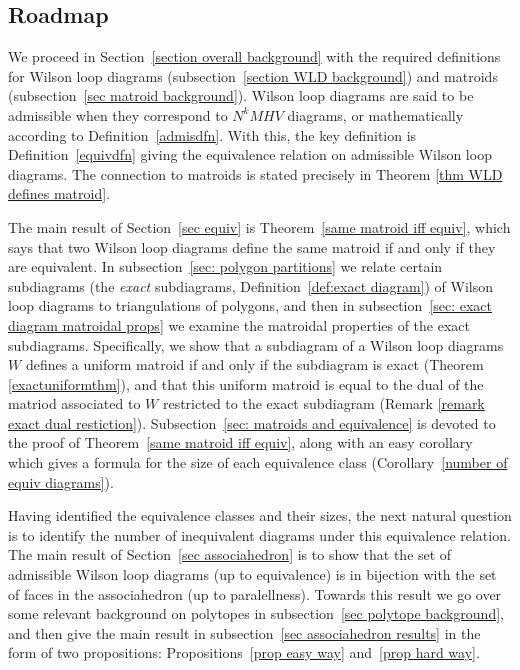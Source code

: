 \documentclass[11pt]{article}
\theoremstyle{remark}
\theoremstyle{definition}
\begin{document}
\subsection{Roadmap}

We proceed in Section~\ref{section overall background} with the required definitions for Wilson loop diagrams (subsection~\ref{section WLD background}) and matroids (subsection~\ref{sec matroid background}).  Wilson loop diagrams  are said to be admissible when they correspond to $N^kMHV$ diagrams, or mathematically according to Definition~\ref{admisdfn}.  With this, the key definition is Definition~\ref{equivdfn} giving the equivalence relation on admissible Wilson loop diagrams.  The connection to matroids is stated precisely in Theorem \ref{thm WLD defines matroid}.

The main result of Section~\ref{sec equiv} is Theorem~\ref{same matroid iff equiv}, which says that two Wilson loop diagrams define the same matroid if and only if they are equivalent.  In subsection~\ref{sec: polygon partitions} we relate certain subdiagrams (the {\em exact} subdiagrams, Definition~\ref{def:exact diagram}) of Wilson loop diagrams to triangulations of polygons, and then in subsection~\ref{sec: exact diagram matroidal props} we examine the matroidal properties of the exact subdiagrams.  Specifically, we show that a subdiagram of a Wilson loop diagrams $W$ defines a uniform matroid if and only if the subdiagram is exact (Theorem \ref{exactuniformthm}), and that this uniform matroid is equal to the dual of the matriod associated to $W$ restricted to the exact subdiagram (Remark \ref{remark exact dual restiction}).  Subsection~\ref{sec: matroids and equivalence} is devoted to the proof of Theorem~\ref{same matroid iff equiv}, along with an easy corollary which gives a formula for the size of each equivalence class (Corollary~\ref{number of equiv diagrams}).

Having identified the equivalence classes and their sizes, the next natural question is to identify the number of inequivalent diagrams under this equivalence relation.  The main result of Section~\ref{sec associahedron} is to show that the set of admissible Wilson loop diagrams (up to equivalence) is in bijection with the set of faces in the associahedron (up to paralellness).  Towards this result we go over some relevant background on polytopes in subsection~\ref{sec polytope background}, and then give the main result in subsection~\ref{sec associahedron results} in the form of two propositions: Propositions~\ref{prop easy way} and~\ref{prop hard way}.
\end{document}
